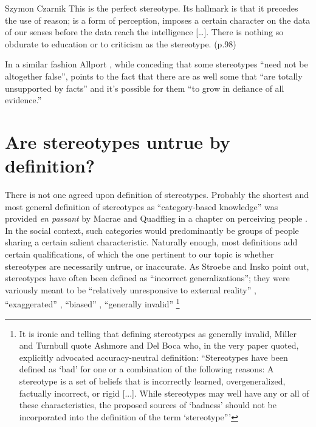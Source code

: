 \begin{artengenv}{Szymon Czarnik}
{This is the perfect stereotype. Its hallmark is that it precedes the use of reason; is a form of perception, imposes a certain character on the data of our senses before the data reach the intelligence […]. There is nothing so obdurate to education or to criticism as the stereotype. (p.98)
}

In a similar fashion Allport
\parencite*[][pp.189–190]{allport_nature_1954}, %
 while conceding that some stereotypes ``need not be altogether false'', points to the fact that there are as well some that ``are totally unsupported by facts'' and it's possible for them ``to grow in defiance of all evidence.''

\section{Are stereotypes untrue by definition?}
There is not one agreed upon definition of stereotypes. Probably the shortest and most general definition of stereotypes as ``category-based knowledge'' was provided \textit{en passant} by Macrae and Quadflieg in a chapter on perceiving people
\parencite[][p.428]{macrae_perceiving_2010}. %
 In the social context, such categories would predominantly be groups of people sharing a certain salient characteristic. Naturally enough, most definitions add certain qualifications, of which the one pertinent to our topic is whether stereotypes are necessarily untrue, or inaccurate. As Stroebe and Insko 
\parencite*[][]{stroebe_stereotype_1989} %
 point out, stereotypes have often been defined as ``incorrect generalizations''; they were variously meant to be ``relatively unresponsive to external reality'' 
\parencite[][]{klineberg_scientific_1951}, %
 ``exaggerated'' 
\parencite[][]{allport_nature_1954}, %
 ``biased'' 
\parencite[][]{english_comprehensive_1958}, %
 ``generally invalid'' 
\parencite[][]{miller_expectancies_1986}%
\footnote{It is ironic and telling that defining stereotypes as generally invalid, Miller and Turnbull quote Ashmore and Del Boca 
\parencite*[][]{hamilton_conceptual_1981} %
 who, in the very paper quoted, explicitly advocated accuracy-neutral definition: ``Stereotypes have been defined as ‘bad' for one or a combination of the following reasons: A stereotype is a set of beliefs that is incorrectly learned, overgeneralized, factually incorrect, or rigid [...]. While stereotypes may well have any or all of these characteristics, the proposed sources of ‘badness' should not be incorporated into the definition of the term ‘stereotype''' 
}
\end{artengenv}
